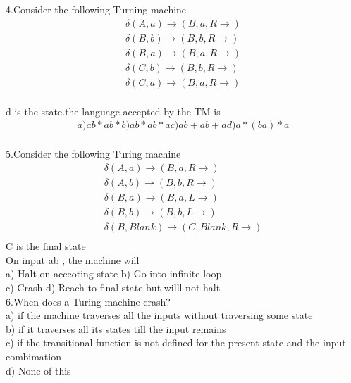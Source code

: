\documentclass{book}
\begin{document}
4.Consider the following Turning machine\\
\begin{align}
\delta(A,a)\rightarrow(B, a,R\rightarrow)\\
\delta(B,b)\rightarrow(B, b,R\rightarrow)\\
\delta(B,a)\rightarrow(B, a,R\rightarrow)\\
\delta(C,b)\rightarrow(B, b,R\rightarrow)\\
\delta(C,a)\rightarrow(B, a,R\rightarrow)\\
\end{align}

d is the state.the language accepted by the TM is\\
\begin{align} 
a)  ab\ast ab \ast      b) ab\ast ab\ast a        c) ab + ab +a		d) a\ast(ba)\ast a\\
\end{align}
 
5.Consider the following Turing machine \\
\begin{align}
\delta(A,a)\rightarrow(B, a,R\rightarrow)\\
\delta(A,b)\rightarrow(B, b,R\rightarrow)\\
\delta(B,a)\rightarrow(B, a,L\rightarrow)\\
\delta(B,b)\rightarrow(B, b,L\rightarrow)\\
 
 \delta(B,Blank)\rightarrow(C, Blank,R\rightarrow)\\
 \end{align}
C  is the final state\\
On input ab , the machine will\\
a) Halt on acceoting state				b) Go into infinite loop\\
c) Crash										d) Reach to final state but willl not halt\\

6.When does a Turing machine crash?\\

a) if the machine traverses all the inputs without  traversing some state\\
b) if it traverses all its states till the input remains\\
c) if the transitional function is not  defined for the present state and the input combimation\\
d) None of this\\
\end{document}
